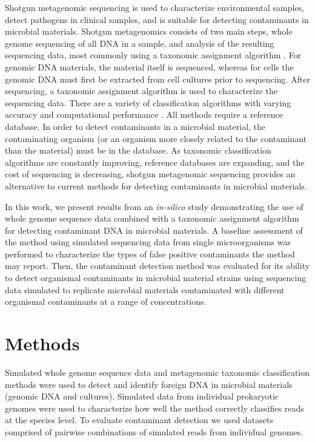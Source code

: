 \documentclass[fleqn,10pt,lineno]{wlpeerj}\usepackage[]{graphicx}\usepackage[]{color}
\begin{document}
Shotgun metagenomic sequencing is used to characterize environmental samples, detect pathogens in clinical samples, and is suitable for detecting contaminants in microbial materials.
Shotgun metagenomics consists of two main steps, whole genome sequencing of all DNA in a sample, and analysis of the resulting sequencing data, most commonly using a taxonomic assignment algorithm \citep{Thomas2012}.
For genomic DNA materials, the material itself is sequenced, whereas for cells the genomic DNA must first be extracted from cell cultures prior to sequencing.
After sequencing, a taxonomic assignment algorithm is used to characterize the sequencing data.
There are a variety of classification algorithms with varying accuracy and computational performance \citep{Bazinet2012,menzel2016fast}.
All methods require a reference database.
In order to detect contaminants in a microbial material, the contaminating organism (or an organism more closely related to the contaminant than the material) must be in the database.
As taxonomic classification algorithms are constantly improving, reference databases are expanding, and the cost of sequencing is decreasing, shotgun metagenomic sequencing provides an alternative to current methods for detecting contaminants in microbial materials.

In this work, we present results from an \textit{in-silico} study demonstrating the use of whole genome sequence data combined with a taxonomic assignment algorithm for detecting contaminant DNA in microbial materials.
A baseline assessment of the method using simulated sequencing data from single microorganisms was performed to characterize the types of false positive contaminants the method may report.
Then, the contaminant detection method was evaluated for its ability to detect organismal contaminants in microbial material strains using sequencing data simulated to replicate microbial materials contaminated with different organismal contaminants at a range of concentrations.

\section*{Methods}
Simulated whole genome sequence data and metagenomic taxonomic classification methods were used to detect and identify foreign DNA in microbial materials (genomic DNA and cultures).
Simulated data from individual prokaryotic genomes were used to characterize how well the method correctly classifies reads at the species level.
To evaluate contaminant detection we used datasets comprised of pairwise combinations of simulated reads from individual genomes.
\end{document}
